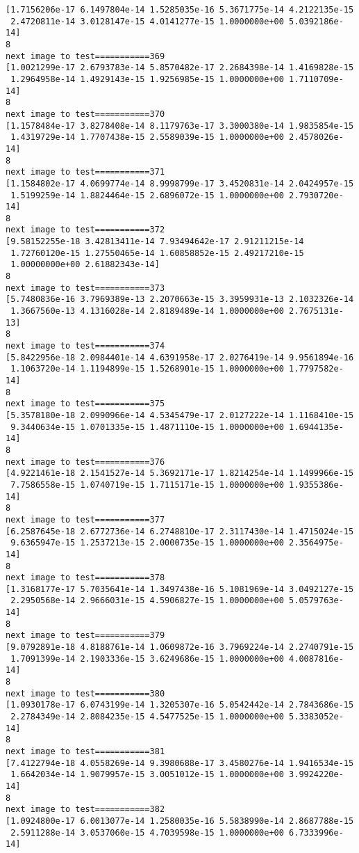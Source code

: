 \documentclass[11pt]{article}
\begin{document}
\begin{Verbatim}[commandchars=\\\{\}]
[1.7156206e-17 6.1497804e-14 1.5285035e-16 5.3671775e-14 4.2122135e-15
 2.4720811e-14 3.0128147e-15 4.0141277e-15 1.0000000e+00 5.0392186e-14]
8
next image to test===========369
[1.0021299e-17 2.6793783e-14 5.8570482e-17 2.2684398e-14 1.4169828e-15
 1.2964958e-14 1.4929143e-15 1.9256985e-15 1.0000000e+00 1.7110709e-14]
8
next image to test===========370
[1.1578484e-17 3.8278408e-14 8.1179763e-17 3.3000380e-14 1.9835854e-15
 1.4319729e-14 1.7707438e-15 2.5589039e-15 1.0000000e+00 2.4578026e-14]
8
next image to test===========371
[1.1584802e-17 4.0699774e-14 8.9998799e-17 3.4520831e-14 2.0424957e-15
 1.5199259e-14 1.8824464e-15 2.6896072e-15 1.0000000e+00 2.7930720e-14]
8
next image to test===========372
[9.58152255e-18 3.42813411e-14 7.93494642e-17 2.91211215e-14
 1.72760120e-15 1.27550465e-14 1.60858852e-15 2.49217210e-15
 1.00000000e+00 2.61882343e-14]
8
next image to test===========373
[5.7480836e-16 3.7969389e-13 2.2070663e-15 3.3959931e-13 2.1032326e-14
 1.3667560e-13 4.1316028e-14 2.8189489e-14 1.0000000e+00 2.7675131e-13]
8
next image to test===========374
[5.8422956e-18 2.0984401e-14 4.6391958e-17 2.0276419e-14 9.9561894e-16
 1.1063720e-14 1.1194899e-15 1.5268901e-15 1.0000000e+00 1.7797582e-14]
8
next image to test===========375
[5.3578180e-18 2.0990966e-14 4.5345479e-17 2.0127222e-14 1.1168410e-15
 9.3440634e-15 1.0701335e-15 1.4871110e-15 1.0000000e+00 1.6944135e-14]
8
next image to test===========376
[4.9221461e-18 2.1541527e-14 5.3692171e-17 1.8214254e-14 1.1499966e-15
 7.7586558e-15 1.0740719e-15 1.7115171e-15 1.0000000e+00 1.9355386e-14]
8
next image to test===========377
[6.2587645e-18 2.6772736e-14 6.2748810e-17 2.3117430e-14 1.4715024e-15
 9.6365947e-15 1.2537213e-15 2.0000735e-15 1.0000000e+00 2.3564975e-14]
8
next image to test===========378
[1.3168177e-17 5.7035641e-14 1.3497438e-16 5.1081969e-14 3.0492127e-15
 2.2950568e-14 2.9666031e-15 4.5906827e-15 1.0000000e+00 5.0579763e-14]
8
next image to test===========379
[9.0792891e-18 4.8188761e-14 1.0609872e-16 3.7969224e-14 2.2740791e-15
 1.7091399e-14 2.1903336e-15 3.6249686e-15 1.0000000e+00 4.0087816e-14]
8
next image to test===========380
[1.0930178e-17 6.0743199e-14 1.3205307e-16 5.0542442e-14 2.7843686e-15
 2.2784349e-14 2.8084235e-15 4.5477525e-15 1.0000000e+00 5.3383052e-14]
8
next image to test===========381
[7.4122794e-18 4.0558269e-14 9.3980688e-17 3.4580276e-14 1.9416534e-15
 1.6642034e-14 1.9079957e-15 3.0051012e-15 1.0000000e+00 3.9924220e-14]
8
next image to test===========382
[1.0924800e-17 6.0013077e-14 1.2580035e-16 5.5838990e-14 2.8687788e-15
 2.5911288e-14 3.0537060e-15 4.7039598e-15 1.0000000e+00 6.7333996e-14]

\end{Verbatim}
\end{document}
